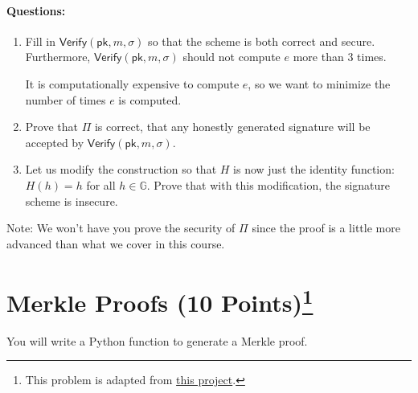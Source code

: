 \documentclass[11pt]{article}
\numberwithin{equation}{section}
\newcommand{\verify}{\mathsf{Verify}}
\newcommand{\pk}{\mathsf{pk}}
\newcommand{\GG}{\mathbb{G}}
\begin{document}
\paragraph{Questions:}
\begin{enumerate}
    \item Fill in $\verify(\pk, m, \sigma)$ so that the scheme is both correct and secure. Furthermore, $\verify(\pk, m, \sigma)$ should not compute $e$ more than $3$ times.

    It is computationally expensive to compute $e$, so we want to minimize the number of times $e$ is computed.
    
    \item Prove that $\Pi$ is correct, that any honestly generated signature will be accepted by $\verify(\pk, m, \sigma)$.
    \item Let us modify the construction so that $H$ is now just the identity function: $H(h) = h$ for all $h \in \GG$. Prove that with this modification, the signature scheme is insecure.
\end{enumerate}

Note: We won't have you prove the security of $\Pi$ since the proof is a little more advanced than what we cover in this course. 
\pagebreak


\section{Merkle Proofs (10 Points)\footnote{This problem is adapted from \href{https://cs251.stanford.edu/hw/proj1.pdf}{this project}.}}
You will write a Python function to generate a Merkle proof.\\ 
\end{document}
